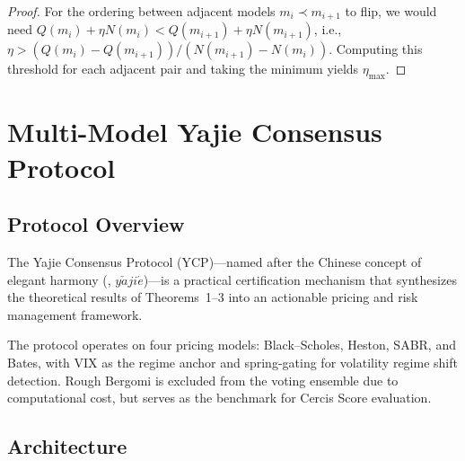 \documentclass[11pt,a4paper]{article}
\theoremstyle{plain}
\theoremstyle{definition}
\theoremstyle{remark}
\begin{document}
\begin{proof}
For the ordering between adjacent models $m_i \prec m_{i+1}$ to flip, we would need $Q(m_i) + \eta N(m_i) < Q(m_{i+1}) + \eta N(m_{i+1})$, i.e., $\eta > (Q(m_i) - Q(m_{i+1})) / (N(m_{i+1}) - N(m_i))$. Computing this threshold for each adjacent pair and taking the minimum yields $\eta_{\max}$.
\end{proof}

\section{Multi-Model Yajie Consensus Protocol}\label{sec:yajie}

\subsection{Protocol Overview}

The Yajie Consensus Protocol (YCP)---named after the Chinese concept of elegant harmony (, $y\check{a} ji\acute{e}$)---is a practical certification mechanism that synthesizes the theoretical results of Theorems~1--3 into an actionable pricing and risk management framework.

The protocol operates on four pricing models: Black--Scholes, Heston, SABR, and Bates, with VIX as the regime anchor and spring-gating for volatility regime shift detection. Rough Bergomi is excluded from the voting ensemble due to computational cost, but serves as the benchmark for Cercis Score evaluation.

\subsection{Architecture}
\end{document}
